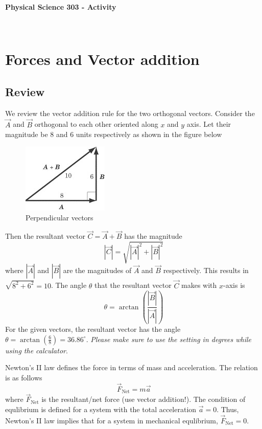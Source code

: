 \documentclass[10pt]{article}
\date{2014-6-22}
\begin{document}
\begin{center}
\begin{Large}\textbf{Physical Science 303 - Activity}\end{Large} \\
\smallskip
\end{center}

\section{Forces and Vector addition}
\subsection{Review}
We review the vector addition rule for the two orthogonal vectors.  Consider the $\vec{A}$ and $\vec{B}$ orthogonal to each other oriented along $x$ and $y$ axis.  Let their magnitude be $8$ and $6$ units respectively as shown in the figure below
\begin{figure}[h]
\includegraphics[scale=.5]{perp_vec}
\centering
\caption{Perpendicular vectors}
\centering
\end{figure}

Then the resultant vector $\vec{C}=\vec{A}+\vec{B}$ has the magnitude 
\begin{equation}
  |\vec{C}|=\sqrt{|\vec{A}|^2+|\vec{B}|^2}
\end{equation}  
where $|\vec{A}|$ and $|\vec{B}|$ are the magnitudes of $\vec{A}$ and $\vec{B}$ respectively.  This results in $\sqrt{8^2+6^2}=10$.
The angle $\theta$ that the resultant vector $\vec{C}$ makes with $x$-axis is 
\begin{equation}
  \theta = \arctan\left(\frac{|\vec{B}|}{|\vec{A}|}\right)
\end{equation}
For the given vectors, the resultant vector has the angle $\theta=\arctan\left(\frac{6}{8}\right)=36.86^\circ$.
\emph{Please make sure to use the setting in degrees while using the calculator}.

Newton's II law defines the force in terms of mass and acceleration.  The relation is as follows
\begin{equation}
  \vec{F}_{\text{Net}}=m\vec{a}
\end{equation}
where $\vec{F}_{\text{Net}}$ is the resultant/net force (use vector addition!). 
The condition of equlibrium is defined for a system with the total acceleration $\vec{a}=0$.  Thus, Newton's II law implies that for a system in mechanical equlibrium, $\vec{F}_{\text{Net}}=0$.
\end{document}
